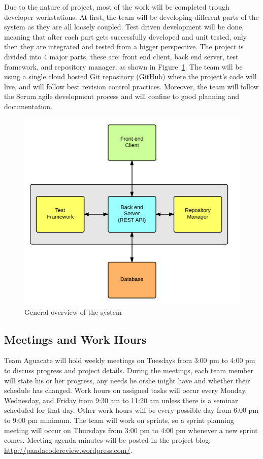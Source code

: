 
Due to the nature of project, most of the work will be completed trough
developer workstations. At first, the team will be developing different parts of
the system as they are all loosely coupled. Test driven development will be
done, meaning that after each part gets successfully developed and unit tested,
only then they are integrated and tested from a bigger perspective. The project
is divided into 4 major parts, these are: front end client, back end server,
test framework, and repository manager, as shown in Figure~\ref{arqu}. The team
will be using a single cloud hosted Git repository (GitHub) where the project's
code will live, and will follow best revision control practices. Moreover, the
team will follow the Scrum agile development process and will confine to good
planning and documentation.

\begin{figure}[H]
	\centering
	\includegraphics[width=\textwidth]{img/bigArquitectOverview}
	\caption{General overview of the system\label{arqu}}
\end{figure}

\subsection{Meetings and Work Hours}

Team Aguacate will hold weekly meetings on Tuesdays from 3:00 pm to 4:00 pm to
discuss progress and project details. During the meetings, each team member will
state his or her progress, any needs he orshe might have and whether their
schedule has changed. Work hours on assigned tasks will occur every Monday,
Wednesday, and Friday from 9:30 am to 11:20 am unless there is a seminar
scheduled for that day. Other work hours will be every possible day from 6:00 pm
to 9:00 pm minimum. The team will work on sprints, so a sprint planning meeting
will occur on Thursdays from 3:00 pm to 4:00 pm whenever a new sprint comes.
Meeting agenda minutes will be posted in the project blog:
\url{http://pandacodereview.wordpress.com/}.

